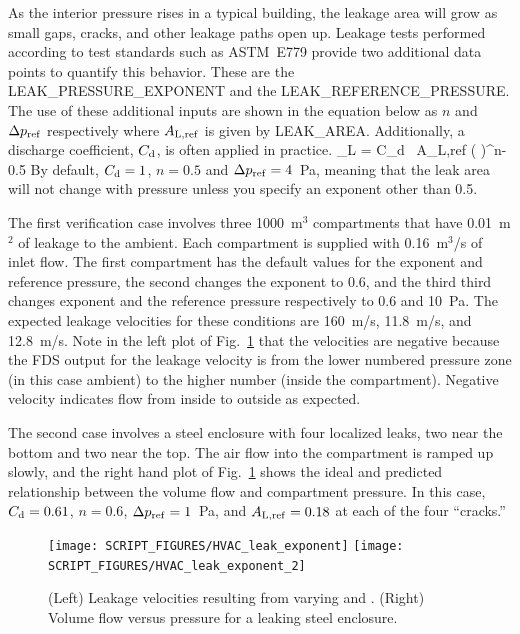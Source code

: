 \documentclass[11pt]{book}
\begin{document}
As the interior pressure rises in a typical building, the leakage area will grow as small gaps, cracks, and other leakage paths open up. Leakage tests performed according to test standards such as ASTM~E779 provide two additional data points to quantify this behavior. These are the {\ct LEAK\_PRESSURE\_EXPONENT} and the {\ct LEAK\_REFERENCE\_PRESSURE}. The use of these additional inputs are shown in the equation below as $n$ and $\Delta p_{\rm ref}$ respectively where $A_{\rm L,ref}$ is given by {\ct LEAK\_AREA}. Additionally, a discharge coefficient, $C_{\rm d}$, is often applied in practice.
\be
   _{\rm L} = C_{\rm d} \, A_{\rm L,ref} \left(  \right)^{n-0.5}  
\ee
By default, $C_{\rm d}=1$, $n=0.5$ and $\Delta p_{\rm ref}=4$~Pa, meaning that the leak area will not change with pressure unless you specify an exponent other than 0.5.

The first verification case involves three 1000~m$^3$ compartments that have 0.01~m$^2$ of leakage to the ambient. Each compartment is supplied with 0.16~m$^3$/s of inlet flow. The first compartment has the default values for the exponent and reference pressure, the second changes the exponent to 0.6, and the third third changes exponent and the reference pressure respectively to 0.6 and 10~Pa. The expected leakage velocities for these conditions are 160~m/s, 11.8~m/s, and 12.8~m/s. Note in the left plot of Fig.~\ref{leak_exponent_fig} that the velocities are negative because the FDS output for the leakage velocity is from the lower numbered pressure zone (in this case ambient) to the higher number (inside the compartment). Negative velocity indicates flow from inside to outside as expected.

The second case involves a steel enclosure with four localized leaks, two near the bottom and two near the top. The air flow into the compartment is ramped up slowly, and the right hand plot of Fig.~\ref{leak_exponent_fig} shows the ideal and predicted relationship between the volume flow and compartment pressure. In this case, $C_{\rm d}=0.61$, $n=0.6$, $\Delta p_{\rm ref}=1$~Pa, and $A_{\rm L,ref}=0.18$ at each of the four ``cracks.''

\begin{figure}[ht]
\texttt{[image: SCRIPT\_FIGURES/HVAC\_leak\_exponent]}
\texttt{[image: SCRIPT\_FIGURES/HVAC\_leak\_exponent\_2]}
\caption[The  cases]{(Left) Leakage velocities resulting from varying  and . (Right) Volume flow versus pressure for a leaking steel enclosure.}
\label{leak_exponent_fig}
\end{figure}
\end{document}
